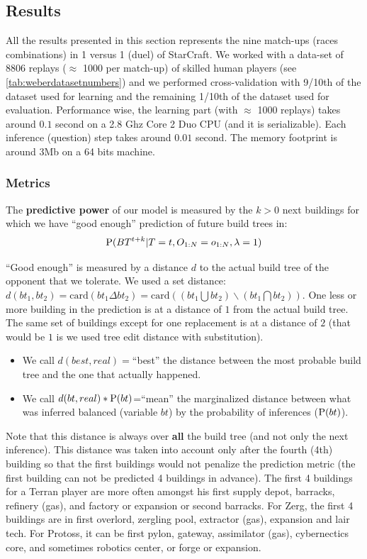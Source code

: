 \subsection{Results}
All the results presented in this section represents the nine match-ups (races combinations) in 1 versus 1 (duel) of StarCraft. We worked with a data-set of 8806 replays ($\approx$ 1000 per match-up) of skilled human players (see \ref{tab:weberdatasetnumbers}) and we performed cross-validation with 9/10th of the dataset used for learning and the remaining 1/10th of the dataset used for evaluation. Performance wise, the learning part (with $\approx$ 1000 replays) takes around $0.1$ second on a 2.8 Ghz Core 2 Duo CPU (and it is serializable). Each inference (question) step takes around $0.01$ second. The memory footprint is around 3Mb on a 64 bits machine.

\subsubsection{Metrics}
\label{sec:buildtreemetrics}
The \textbf{predictive power} of our model is measured by the $k>0$ next buildings for which we have ``good enough'' prediction of future build trees in:
$$\mathrm{P}(BT^{t+k} | T=t, O_{1:N}=o_{1:N}, \lambda = 1)$$

``Good enough'' is measured by a distance $d$ to the actual build tree of the opponent that we tolerate. We used a set distance: $d(bt_1, bt_2) = \mathrm{card}(bt_1 \Delta bt_2) = \mathrm{card}((bt_1\bigcup bt_2) \backslash (bt_1\bigcap bt_2))$. One less or more building in the prediction is at a distance of $1$ from the actual build tree. The same set of buildings except for one replacement is at a distance of $2$ (that would be $1$ is we used tree edit distance with substitution). 
\begin{itemize}
    \item We call $d(best,real)=$``best'' the distance between the most probable build tree and the one that actually happened.
    \item We call $d(bt,real)*\mathrm{P}(bt)$=``mean'' the marginalized distance between what was inferred balanced (variable $bt$) by the probability of inferences ($\mathrm{P}(bt)$). 
\end{itemize} 
Note that this distance is always over \textbf{all} the build tree (and not only the next inference). This distance was taken into account only after the fourth (4th) building so that the first buildings would not penalize the prediction metric (the first building can not be predicted 4 buildings in advance). The first 4 buildings for a Terran player are more often amongst his first supply depot, barracks, refinery (gas), and factory or expansion or second barracks. For Zerg, the first 4 buildings are in first overlord, zergling pool, extractor (gas), expansion and lair tech. For Protoss, it can be first pylon, gateway, assimilator (gas), cybernectics core, and sometimes robotics center, or forge or expansion.

